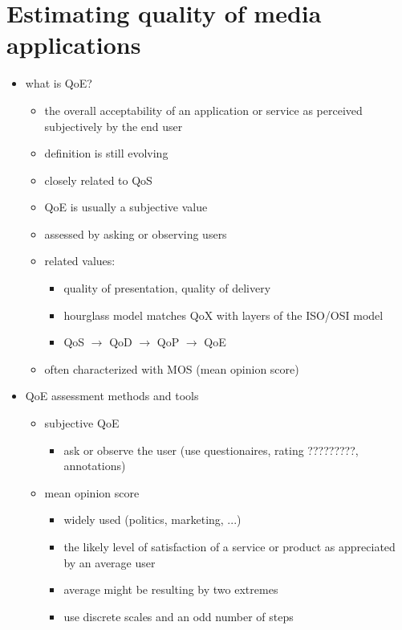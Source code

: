 \documentclass[a4paper,10pt]{scrreprt}
\begin{document}
\section{Estimating quality of media applications}
\begin{itemize}
 \item what is QoE? 
 \begin{itemize}
  \item the overall acceptability of an application or service as perceived subjectively by the end user
  \item definition is still evolving
  \item closely related to QoS
  \item QoE is usually a subjective value 
  \item assessed by asking or observing users 
 \end{itemize}
 \begin{itemize}
 \item related values: 
 \begin{itemize}
  \item quality of presentation, quality of delivery 
  \item hourglass model matches QoX with layers of the ISO/OSI model 
  \item QoS $\rightarrow$ QoD $\rightarrow$ QoP $\rightarrow$ QoE 
 \end{itemize}
 \item often characterized with MOS (mean opinion score)
\end{itemize}
\item QoE assessment methods and tools 
\begin{itemize}
 \item subjective QoE 
 \begin{itemize}
  \item ask or observe the user (use questionaires, rating ?????????, annotations)
 \end{itemize}
 \item mean opinion score 
 \begin{itemize}
  \item widely used (politics, marketing, ...)
  \item the likely level of satisfaction of a service or product as appreciated by an average user
  \item average might be resulting by two extremes 
  \item use discrete scales and an odd number of steps
 \end{itemize}
\end{itemize}

\end{itemize}
\end{document}
